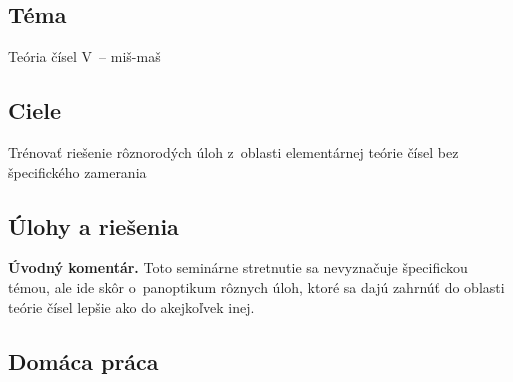 
\subsection*{Téma}
Teória čísel V~-- miš-maš
\subsection*{Ciele}
Trénovať riešenie rôznorodých úloh z~oblasti elementárnej teórie čísel bez špecifického zamerania

\subsection*{Úlohy a riešenia}

\textbf{Úvodný komentár.}
Toto seminárne stretnutie sa nevyznačuje špecifickou témou, ale ide skôr o~panoptikum rôznych úloh, ktoré sa dajú zahrnúť do oblasti teórie čísel lepšie ako do akejkoľvek inej.
















\subsection*{Domáca práca}






